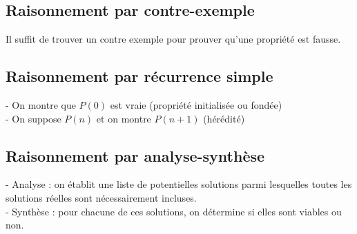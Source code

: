 \begin{multicols}{2}
      \subsection{Raisonnement par contre-exemple}\label{subsec:raisonnement-par-contre-exemple}
        
        Il suffit de trouver un contre exemple pour prouver qu'une propriété est fausse.
      
      \subsection{Raisonnement par récurrence simple}\label{subsec:raisonnement-par-recurrence}
        
        - On montre que $P(0)$ est vraie (propriété initialisée ou fondée)\\
        - On suppose $P(n)$ et on montre $P(n+1)$ (hérédité)
      
      \subsection{Raisonnement par analyse-synthèse}\label{subsec:raisonnement-par-analyse-synthese}
        
        - Analyse : on établit une liste de potentielles solutions parmi lesquelles toutes les solutions réelles sont nécessairement incluses.\\
        - Synthèse : pour chacune de ces solutions,  on détermine si elles sont viables ou non.
    
    \end{multicols}
  
  
